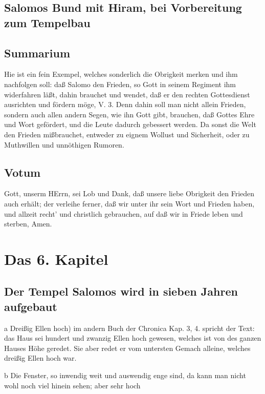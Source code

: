 \section{Salomos Bund mit Hiram, bei Vorbereitung zum Tempelbau}

\section{Summarium}

Hie ist ein fein Exempel, welches sonderlich die Obrigkeit merken und ihm nachfolgen soll: daß Salomo den Frieden, so Gott in seinem Regiment ihm widerfahren läßt, dahin brauchet und wendet, daß er den rechten Gottesdienst ausrichten und fördern möge, V. 3. Denn dahin soll man nicht allein Frieden, sondern auch allen andern Segen, wie ihn Gott gibt, brauchen, daß Gottes Ehre und Wort gefördert, und die Leute dadurch gebessert werden. Da sonst die Welt den Frieden mißbrauchet, entweder zu eignem Wollust und Sicherheit, oder zu Muthwillen und unnöthigen Rumoren.

\section{Votum}

Gott, unserm HErrn, sei Lob und Dank, daß unsere liebe Obrigkeit den Frieden auch erhält; der verleihe ferner, daß wir unter ihr sein Wort und Frieden haben, und allzeit recht' und christlich gebrauchen, auf daß wir in Friede leben und sterben, Amen.

\chapter{Das 6. Kapitel}

\section{Der Tempel Salomos wird in sieben Jahren aufgebaut}

a Dreißig Ellen hoch) im andern Buch der Chronica Kap. 3, 4. spricht der Text: das Haus sei hundert und zwanzig Ellen hoch gewesen, welches ist von des ganzen Hauses Höhe geredet. Sie aber redet er vom untersten Gemach alleine, welches dreißig Ellen hoch war.

b Die Fenster, so inwendig weit und auswendig enge sind, da kann man nicht wohl noch viel hinein sehen; aber sehr hoch

